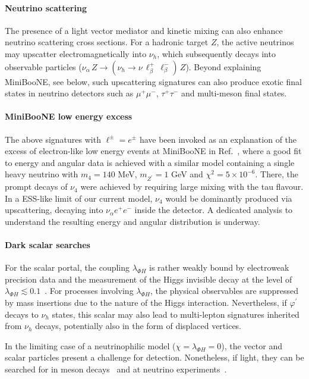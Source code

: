 \paragraph{Neutrino scattering} The presence of a light vector mediator and kinetic mixing can also enhance neutrino scattering cross sections. For a hadronic target $Z$, the active neutrinos may upscatter electromagnetically into $\nu_h$, which subsequently decays into observable particles ($\nu_\alpha \, Z \to (\nu_h \to \nu\, \ell_\beta^+\,\ell_\beta^-)\, Z$). Beyond explaining MiniBooNE, see below, such upscattering signatures can also produce exotic final states in neutrino detectors such as $\mu^+\mu^-$, $\tau^+\tau^-$ and multi-meson final states.


\paragraph{MiniBooNE low energy excess} The above signatures with $\ell^\pm = e^\pm$ have been invoked as an explanation of the excess of electron-like low energy events at MiniBooNE in Ref.~\cite{Ballett:2018ynz}, where a good fit to energy and angular data is achieved with a similar model containing a single heavy neutrino with $m_4 = 140$ MeV, $m_{Z^\prime} = 1$ GeV and $\chi^2 = 5\times10^{-6}$. There, the prompt decays of $\nu_4$ were achieved by requiring large mixing with the tau flavour. In a ESS-like limit of our current model, $\nu_4$ would be dominantly produced via upscattering, decaying into $\nu_\alpha e^+e^-$ inside the detector. A dedicated analysis to understand the resulting energy and angular distribution is underway.

\paragraph{Dark scalar searches}
For the scalar portal, the coupling $\lambda_{\Phi H}$ is rather weakly bound by electroweak precision data and the measurement of the Higgs invisible decay at the level of $\lambda_{\Phi H} \lesssim 0.1$~\cite{Sirunyan:2018owy}. For processes involving $\lambda_{\Phi H}$, the physical observables are suppressed by mass insertions due to the nature of the Higgs interaction. Nevertheless, if $\varphi^\prime$ decays to $\nu_h$ states, this scalar may also lead to multi-lepton signatures inherited from $\nu_h$ decays, potentially also in the form of displaced vertices.

In the limiting case of a neutrinophilic model ($\chi=\lambda_{\Phi H}=0$), the vector and scalar particles present a challenge for detection. Nonetheless, if light, they can be searched for in meson decays~\cite{Laha:2013xua,Bakhti:2017jhm} and at neutrino experiments~\cite{Bakhti:2018avv}.


